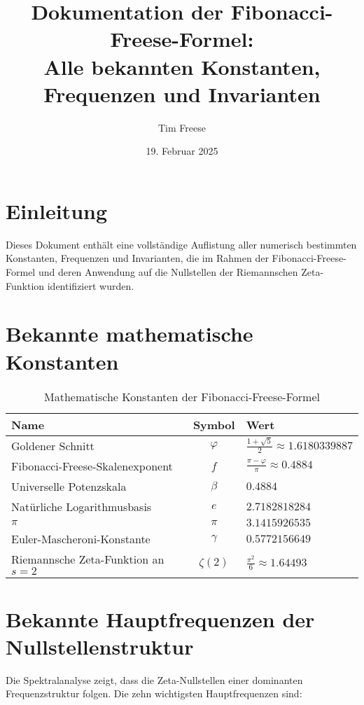 \documentclass[a4paper,12pt]{article}
\title{\textbf{Dokumentation der Fibonacci-Freese-Formel: \\ Alle bekannten Konstanten, Frequenzen und Invarianten}}
\author{Tim Freese}
\date{19. Februar 2025}
\begin{document}
\maketitle

\section{Einleitung}
Dieses Dokument enthält eine vollständige Auflistung aller numerisch bestimmten Konstanten, Frequenzen und Invarianten, die im Rahmen der Fibonacci-Freese-Formel und deren Anwendung auf die Nullstellen der Riemannschen Zeta-Funktion identifiziert wurden.

\section{Bekannte mathematische Konstanten}
\begin{table}[h]
    \centering
    \renewcommand{\arraystretch}{1.4}
    \begin{tabular}{l c l}
        \toprule
        \textbf{Name} & \textbf{Symbol} & \textbf{Wert} \\
        \midrule
        Goldener Schnitt & \( \varphi \) & \( \frac{1+\sqrt{5}}{2} \approx 1.6180339887 \) \\
        Fibonacci-Freese-Skalenexponent & \( f \) & \( \frac{\pi - \varphi}{\pi} \approx 0.4884 \) \\
        Universelle Potenzskala & \( \beta \) & \( 0.4884 \) \\
        Natürliche Logarithmusbasis & \( e \) & \( 2.7182818284 \) \\
        \(\pi\) & \( \pi \) & \( 3.1415926535 \) \\
        Euler-Mascheroni-Konstante & \( \gamma \) & \( 0.5772156649 \) \\
        Riemannsche Zeta-Funktion an \( s=2 \) & \( \zeta(2) \) & \( \frac{\pi^2}{6} \approx 1.64493 \) \\
        \bottomrule
    \end{tabular}
    \caption{Mathematische Konstanten der Fibonacci-Freese-Formel}
\end{table}

\section{Bekannte Hauptfrequenzen der Nullstellenstruktur}
Die Spektralanalyse zeigt, dass die Zeta-Nullstellen einer dominanten Frequenzstruktur folgen. Die zehn wichtigsten Hauptfrequenzen sind:
\end{document}
